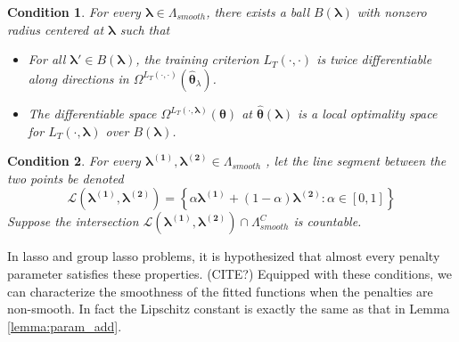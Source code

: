 \documentclass[12pt]{article}
\newtheorem{condition}{Condition}
\begin{document}
\begin{condition}
	\label{condn:nonsmooth1}
	For every $\boldsymbol{\lambda} \in \Lambda_{smooth}$, there exists a ball $B(\boldsymbol{\lambda})$ with nonzero radius centered at $\boldsymbol{\lambda}$ such that
	\begin{itemize}
		\item For all $\boldsymbol{\lambda}'\in B(\boldsymbol{\lambda})$, the training criterion $L_{T}(\cdot,\cdot)$
		is twice differentiable along directions in $\Omega^{L_{T}(\cdot,\cdot)}\left(\hat{\boldsymbol{\theta}}_{\lambda}\right)$.
		\item The differentiable space $\Omega^{L_T(\cdot, \boldsymbol{\lambda})}(\boldsymbol{\theta})$ at $\hat{\boldsymbol \theta}\left(\boldsymbol{\lambda}\right)$ is a local optimality space for $L_T\left(\cdot,\boldsymbol{\lambda}\right)$ over $B(\boldsymbol{\lambda})$.
	\end{itemize}
\end{condition}
\begin{condition}
	\label{condn:nonsmooth2}
	For every $\boldsymbol{\lambda^{(1)}},\boldsymbol{\lambda^{(2)}}\in\Lambda_{smooth}$
	, let the line segment between the two points be denoted 
	$$
	\mathcal{L}(\boldsymbol{\lambda^{(1)}},\boldsymbol{\lambda^{(2)}})=\left\{ \alpha\boldsymbol{\lambda^{(1)}}+(1-\alpha)\boldsymbol{\lambda^{(2)}}:\alpha\in[0,1]\right\} 
	$$
	Suppose the intersection $\mathcal{L}(\boldsymbol{\lambda^{(1)}},\boldsymbol{\lambda^{(2)}})\cap\Lambda_{smooth}^{C}$
	is countable.
\end{condition}
In lasso and group lasso problems, it is hypothesized that almost every penalty parameter satisfies these properties. (CITE?) Equipped with these conditions, we can characterize the smoothness of the fitted functions when the penalties are non-smooth. In fact the Lipschitz constant is exactly the same as that in Lemma \ref{lemma:param_add}.
\end{document}
